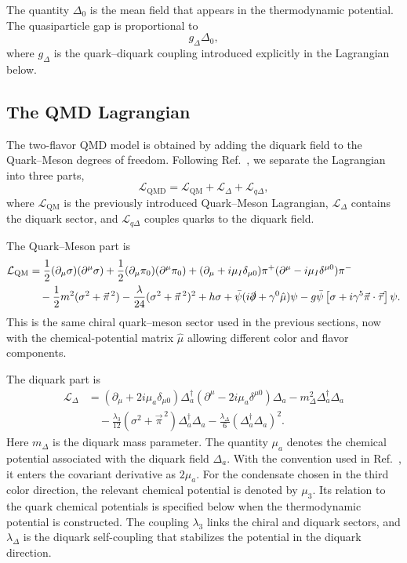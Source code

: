 The quantity \(\Delta_0\) is the mean field that appears in the
thermodynamic potential. The quasiparticle gap is proportional to
\begin{equation}
g_\Delta \Delta_0 ,
\end{equation}
where \(g_\Delta\) is the quark--diquark coupling introduced explicitly in
the Lagrangian below.

\subsection*{The QMD Lagrangian}

The two-flavor QMD model is obtained by adding the
diquark field to the Quark--Meson degrees of freedom. Following
Ref.~\cite{Andersen2024}, we separate the Lagrangian into three parts,
\begin{equation}
\mathcal{L}_{\mathrm{QMD}}
=
\mathcal{L}_{\mathrm{QM}}
+
\mathcal{L}_{\Delta}
+
\mathcal{L}_{q\Delta},
\label{eq:qmd_lagrangian_split}
\end{equation}
where \(\mathcal{L}_{\mathrm{QM}}\) is the previously introduced
Quark--Meson Lagrangian, \(\mathcal{L}_{\Delta}\) contains the diquark
sector, and \(\mathcal{L}_{q\Delta}\) couples quarks to the diquark field.

The Quark--Meson part is
\begin{align}
\mathcal{L}_{\mathrm{QM}}
&=
\frac{1}{2}(\partial_\mu\sigma)(\partial^\mu\sigma)
+
\frac{1}{2}(\partial_\mu\pi_0)(\partial^\mu\pi_0)
+
(\partial_\mu+i\mu_I\delta_{\mu0})\pi^+
(\partial^\mu-i\mu_I\delta^{\mu0})\pi^-
\nonumber \\
&\quad
-
\frac{1}{2}m^2(\sigma^2+\vec{\pi}^{\,2})
-
\frac{\lambda}{24}(\sigma^2+\vec{\pi}^{\,2})^2
+
h\sigma
+
\bar{\psi}(i\slashed{\partial}+\gamma^0\hat{\mu})\psi
-
g\bar{\psi}
\left[
\sigma+i\gamma^5\vec{\pi}\cdot\vec{\tau}
\right]\psi .
\label{eq:qmd_qm_part}
\end{align}
This is the same chiral quark--meson sector used in the previous sections,
now with the chemical-potential matrix \(\hat{\mu}\) allowing different
color and flavor components.

The diquark part is
\begin{align}
\mathcal{L}_{\Delta}
&=
(\partial_\mu+2i\mu_a\delta_{\mu0})\Delta_a^\dagger
(\partial^\mu-2i\mu_a\delta^{\mu0})\Delta_a
-
m_\Delta^2\Delta_a^\dagger\Delta_a
\nonumber \\
&\quad
-
\frac{\lambda_3}{12}
(\sigma^2+\vec{\pi}^{\,2})\Delta_a^\dagger\Delta_a
-
\frac{\lambda_\Delta}{6}
(\Delta_a^\dagger\Delta_a)^2 .
\label{eq:qmd_diquark_part}
\end{align}
Here \(m_\Delta\) is the diquark mass parameter. The quantity \(\mu_a\)
denotes the chemical potential associated with the diquark field
\(\Delta_a\). With the convention used in Ref.~\cite{Andersen2024}, it
enters the covariant derivative as \(2\mu_a\). For the condensate chosen
in the third color direction, the relevant chemical potential is denoted
by \(\mu_3\). Its relation to the quark chemical potentials is specified
below when the thermodynamic potential is constructed. The coupling
\(\lambda_3\) links the chiral and diquark sectors, and
\(\lambda_\Delta\) is the diquark self-coupling that stabilizes the
potential in the diquark direction.


